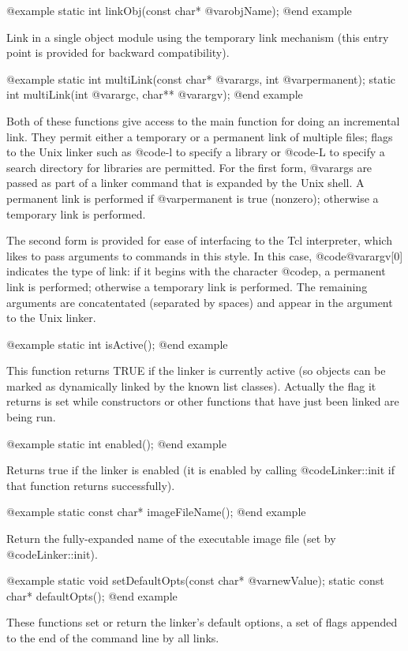 @example
static int linkObj(const char* @var{objName});
@end example

Link in a single object module using the temporary link mechanism
(this entry point is provided for backward compatibility).

@example
static int multiLink(const char* @var{args}, int @var{permanent});
static int multiLink(int @var{argc}, char** @var{argv});
@end example

Both of these functions give access to the main function for doing
an incremental link.  They permit either a temporary or a permanent
link of multiple files; flags to the Unix linker such as @code{-l}
to specify a library or @code{-L} to specify a search directory for
libraries are permitted.  For the first form, @var{args} are passed
as part of a linker command that is expanded by the Unix shell.  A
permanent link is performed if @var{permanent} is true (nonzero);
otherwise a temporary link is performed.

The second form is provided for ease of interfacing to the Tcl
interpreter, which likes to pass arguments to commands in this
style.  In this case, @code{@var{argv}[0]} indicates the type of
link: if it begins with the character @code{p}, a permanent link
is performed; otherwise a temporary link is performed.  The remaining
arguments are concatentated (separated by spaces) and appear in the
argument to the Unix linker.

@example
static int isActive();
@end example


This function returns TRUE if the linker is currently active (so objects
can be marked as dynamically linked by the known list classes).
Actually the flag it returns is set while constructors or other
functions that have just been linked are being run.

@example
static int enabled();
@end example

Returns true if the linker is enabled (it is enabled by calling
@code{Linker::init} if that function returns successfully).

@example
static const char* imageFileName();
@end example

Return the fully-expanded name of the executable image file (set by
@code{Linker::init}).

@example
static void setDefaultOpts(const char* @var{newValue});
static const char* defaultOpts();
@end example

These functions set or return the linker's default options, a set of
flags appended to the end of the command line by all links.

